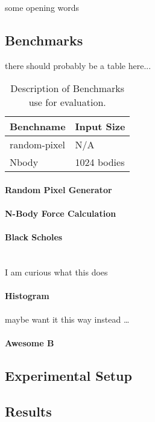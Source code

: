 
some opening words

\subsection{Benchmarks}
there should probably be a table here...
\begin{table}
\begin{center}
\begin{tabular}{| l | l |}
\hline
Benchname & Input Size \\
\hline
random-pixel & N/A \\
\hline
Nbody &  1024 bodies \\
\hline
\end{tabular}
\end{center}
\caption{Description of Benchmarks use for evaluation.}
\label{benchmark-table}
\end{table}

\paragraph{Random Pixel Generator}

\paragraph{N-Body Force Calculation}

\paragraph{Black Scholes} \hspace{0pt}\\
I am curious what this does


\paragraph{Histogram}
maybe want it this way instead \ldots

\paragraph{Awesome B}

\subsection{Experimental Setup}

\subsection{Results}

